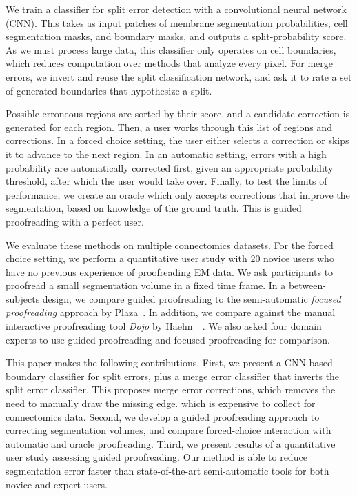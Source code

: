 We train a classifier for split error detection with a convolutional neural network
(CNN). This takes as input patches of membrane segmentation probabilities, cell
segmentation masks, and boundary masks, and outputs a split-probability score. As we
must process large data, this classifier only operates on cell boundaries, which
reduces computation over methods that analyze every pixel. For merge errors, we
invert and reuse the split classification network, and ask it to rate a
set of generated boundaries that hypothesize a split. %

Possible erroneous regions are sorted by their score, and a candidate correction is generated for each
region. Then, a user works through this list of regions and corrections. In a
forced choice setting, the user either selects a correction or skips it to
advance to the next region. In an automatic setting, errors with a high probability are automatically corrected first, given an appropriate
probability threshold, after which the user would take over. Finally, to test
the limits of performance, we create an oracle which only accepts corrections
that improve the segmentation, based on knowledge of the ground truth. This is
guided proofreading with a perfect user.

We evaluate these methods on multiple connectomics datasets. For the forced
choice setting, we perform a quantitative user study with 20 novice users who
have no previous experience of proofreading EM data. We ask participants to
proofread a small segmentation volume in a fixed time frame. In a
between-subjects design, we compare guided proofreading to the semi-automatic
\textit{focused proofreading} approach by Plaza~\cite{focused_proofreading}. In
addition, we compare against the manual interactive proofreading tool
\textit{Dojo} by Haehn~\etal~\cite{haehn_dojo_2014}. We also asked four domain
experts to use guided proofreading and focused proofreading for comparison.

This paper makes the following contributions.
%
First, we present a CNN-based boundary classifier for split errors, plus a merge
error classifier that inverts the split error classifier. This proposes merge error corrections, 
which removes the need to manually draw the missing
edge.  which is
expensive to collect for connectomics data.
%
Second, we develop a guided proofreading approach to correcting segmentation
volumes, and compare forced-choice interaction with
automatic and oracle proofreading.
%
Third, we present results of a quantitative user study assessing
guided proofreading. Our method is able to reduce segmentation
error faster than state-of-the-art semi-automatic tools for both novice and
expert users.
%

